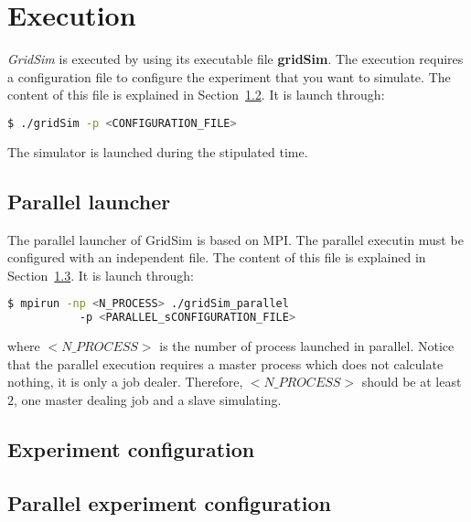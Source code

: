 \chapter{Execution}
\label{chap:execution}

{\it GridSim} is executed by using its executable file {\bf gridSim}.
The execution requires a configuration file to configure the experiment that you want to simulate.
The content of this file is explained in Section~\ref{exe:single_cnf}.
It is launch through:
\begin{lstlisting}[language=bash]
  $ ./gridSim -p <CONFIGURATION_FILE>
\end{lstlisting}
\noindent
The simulator is launched during the stipulated time.


%
\section{Parallel launcher}

The parallel launcher of GridSim is based on MPI.
The parallel executin must be configured with an independent file.
The content of this file is explained in Section~\ref{exe:parallel_cnf}.
It is launch through:
\begin{lstlisting}[language=bash]
  $ mpirun -np <N_PROCESS> ./gridSim_parallel 
           -p <PARALLEL_sCONFIGURATION_FILE>
\end{lstlisting}
where $<N\_PROCESS>$ is the number of process launched in parallel.
Notice that the parallel execution requires a master process which does not calculate nothing, it is only a job dealer.
Therefore, $<N\_PROCESS>$ should be at least $2$, one master dealing job and a slave simulating.

%
\section{Experiment configuration}
\label{exe:single_cnf}


%
\section{Parallel experiment configuration}
\label{exe:parallel_cnf}








